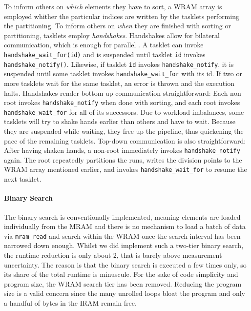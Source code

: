 To inform others on \emph{which} elements they have to sort, a WRAM array is employed whither the particular indices are written by the tasklets performing the partitioning.
To inform others on \emph{when} they are finished with sorting or partitioning, tasklets employ \emph{handshakes}.
Handshakes allow for bilateral communication, which is enough for parallel \MS{}.
A tasklet can invoke \lstinline|handshake_wait_for(id)| and is suspended until tasklet \lstinline|id| invokes \lstinline|handshake_notify()|.
Likewise, if tasklet \lstinline|id| invokes \lstinline|handshake_notify|, it is suspended until some tasklet invokes \lstinline|handshake_wait_for| with its id.
If two or more tasklets wait for the same tasklet, an error is thrown and the execution halts.
Handshakes render bottom-up communication straightforward:
Each non-root invokes \lstinline|handshake_notify| when done with sorting, and each root invokes \lstinline|handshake_wait_for| for all of its successors.
Due to workload imbalances, some tasklets will try to shake hands earlier than others and have to wait.
Because they are suspended while waiting, they free up the pipeline, thus quickening the pace of the remaining tasklets.
Top-down communication is also straightforward:
After having shaken hands, a non-root immediately invokes \lstinline|handshake_notify| again.
The root repeatedly partitions the runs, writes the division points to the WRAM array mentioned earlier, and invokes \lstinline|handshake_wait_for| to resume the next tasklet.


\paragraph{Binary Search}
The binary search is conventionally implemented, meaning elements are loaded individually from the MRAM and there is no mechanism to load a batch of data via \lstinline|mram_read| and search within the WRAM once the search interval has been narrowed down enough.
Whilst we did implement such a two-tier binary search, the runtime reduction is only about \qty{2}{\permyriad}, that is barely above measurement uncertainty.
The reason is that the binary search is executed a few times only, so its share of the total runtime is minuscule.
For the sake of code simplicity and program size, the WRAM search tier has been removed.
Reducing the program size is a valid concern since the many unrolled loops bloat the program and only a handful of bytes in the IRAM remain free.

